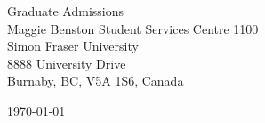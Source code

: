 \begin{minipage}{0.49\textwidth}
\begin{flushleft}
\noindent
Graduate Admissions \\
Maggie Benston Student Services Centre 1100 \\
Simon Fraser University \\
8888 University Drive \\
Burnaby, BC, V5A 1S6, Canada
\end{flushleft}
\end{minipage}
\begin{minipage}{0.47\textwidth}
\begin{flushright}
\today
\end{flushright}
\end{minipage} \\

\newcommand{\univ}{Simon Fraser University}
\newcommand{\univshort}{SFU}
\newcommand{\degree}{Ph.D.}
\newcommand{\dept}{Computer Science}